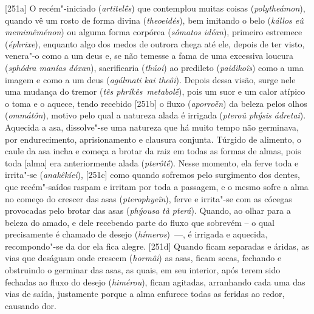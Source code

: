 [251a] O recém"-iniciado (\emph{artitelḗs}) que contemplou muitas
coisas (\emph{polytheámon}), quando vê um rosto de forma divina
(\emph{theoeidés}), bem imitando o belo (\emph{kállos eû memimêménon})
ou alguma forma corpórea (\emph{sṓmatos idéan}), primeiro estremece
(\emph{éphrixe}), enquanto algo dos medos de outrora chega até ele,
depois de ter visto, venera"-o como a um deus e, se não temesse a fama de
uma excessiva loucura (\emph{sphódra manías dóxan}), sacrificaria
(\emph{thúoi}) ao predileto (\emph{paidikoîs}) como a uma imagem e como
a um deus (\emph{agálmati kai theôi}). Depois dessa visão, surge nele
uma mudança do tremor (\emph{tês phríkês}~\emph{metabolḗ}), pois um suor
e um calor atípico o toma e o aquece, tendo recebido [251b] o fluxo
(\emph{aporroḕn}) da beleza pelos olhos (\emph{ommátôn}), motivo pelo
qual a natureza alada é irrigada (\emph{pteroû phýsis ádretai}).
Aquecida a asa, dissolve"-se uma natureza que há muito tempo não
germinava, por endurecimento, aprisionamento e clausura conjunta.
Túrgido de alimento, o caule da asa incha e começa a brotar da raiz em
todas as formas de almas, pois toda [alma] era anteriormente alada
(\emph{pterôtḗ}). Nesse momento, ela ferve toda e irrita"-se
(\emph{anakêkíei}), [251c] como quando sofremos pelo surgimento dos
dentes, que recém"-saídos raspam e irritam por toda a passagem, e o mesmo
sofre a alma no começo do crescer das asas (\emph{pterophyeîn}), ferve e
irrita"-se com as cócegas provocadas pelo brotar das asas (\emph{phýousa
tà pterá}). Quando, ao olhar para a beleza do amado, e dele recebendo
parte do fluxo que sobrevém -- o qual precisamente é chamado de desejo
(\emph{hímeros})~\mbox{---,} é irrigada e aquecida, recompondo"-se da dor ela
fica alegre. [251d] Quando ficam separadas e áridas, as vias que
deságuam onde crescem (\emph{hormâi}) as asas, ficam secas, fechando e
obstruindo o germinar das asas, as quais, em seu interior, após terem
sido fechadas ao fluxo do desejo (\emph{himérou}), ficam agitadas,
arranhando cada uma das vias de saída, justamente porque a alma enfurece
todas as feridas ao redor, causando dor.

